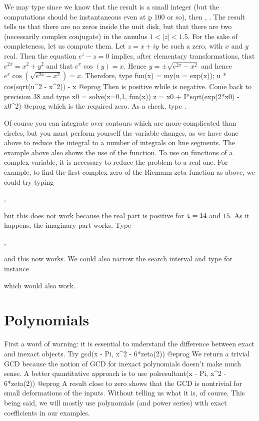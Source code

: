 We may type  since we know that the result is a small integer
(but the computations should be instantaneous even at \b{p} 100 or so),
then , . The result tells us that there are
no zeros inside the unit disk, but that there are two (necessarily
complex conjugate) in the annulus $1<|z|<1.5$. For the sake of
completeness, let us compute them. Let $z = x+iy$ be such a zero, with
$x$ and $y$ real. Then the equation $e^z-z=0$ implies, after elementary
transformations, that $e^{2x}=x^2+y^2$ and that $e^x\cos(y)=x$. Hence
$y=\pm\sqrt{e^{2x}-x^2}$ and hence $e^x\cos(\sqrt{e^{2x}-x^2})=x$.
Therefore, type
\bprog
  fun(x) = my(u = exp(x)); u * cos(sqrt(u^2 - x^2)) - x
@eprog\noindent
Then  is positive while  is negative. Come
back to precision 38 and type
\bprog
  x0 = solve(x=0,1, fun(x))
  z = x0 + I*sqrt(exp(2*x0) - x0^2)
@eprog\noindent
which is the required zero. As a check, type .

Of course you can integrate over contours which are more complicated than
circles, but you must perform yourself the variable changes, as we have done
above to reduce the integral to a number of integrals on line segments.
\smallskip
%
The example above also shows the use of the  function. To use
 on functions of a complex variable, it is necessary to reduce the
problem to a real one. For example, to find the first complex zero of the
Riemann zeta function as above, we could try typing

,

\noindent but this does not work because the real part is positive for
${\tt t}=14$ and $15$. As it happens, the imaginary part works. Type

,

\noindent and this now works. We could also narrow the search interval and
type for instance


\noindent which would also work.

\section{Polynomials}

First a word of warning: it is essential to understand the difference between
exact and inexact objects. Try
\bprog
  gcd(x - Pi, x^2 - 6*zeta(2))
@eprog\noindent
We return a trivial GCD because the notion of GCD for inexact polynomials
doesn't make much sense. A better quantitative approach is to use
\bprog
  polresultant(x - Pi, x^2 - 6*zeta(2))
@eprog\noindent
A result close to zero shows that the GCD is nontrivial for small
deformations of the inputs. Without telling us what it is, of course. This
being said, we will mostly use polynomials (and power series) with exact
coefficients in our examples.\smallskip

